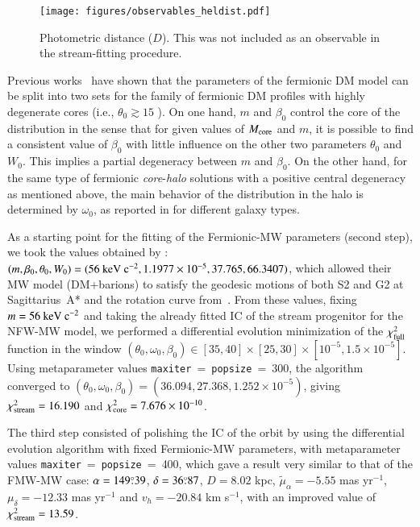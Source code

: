 \documentclass[referee]{aa} %
\begin{document}
\begin{figure}
   \texttt{[image: figures/observables\_heldist.pdf]}
   \caption{Photometric distance ($D$). This was not included as an observable in the stream-fitting procedure.}
   \label{fig:obs_radial}
\end{figure}
Previous works~\citep{arguelles_novel_2018,2019PDU....24..278A,2023ApJ...945....1K} have shown that the parameters of the fermionic DM model can be split into two sets for the family of fermionic DM profiles with highly degenerate cores (i.e., $\theta_0 \gtrsim 15$ \citealp{2019PDU....24..278A}). On one hand, $m$ and $\beta_0$ control the core of the distribution in the sense that for given values of $M_{\rm{core}}$ and $m$, it is possible to find a consistent value of $\beta_0$ with little influence on the other two parameters $\theta_0$ and $W_0$. This implies a partial degeneracy between $m$ and $\beta_0$.
On the other hand, for the same type of fermionic \textit{core}-\textit{halo} solutions with a positive central degeneracy as mentioned above, the main behavior of the distribution in the halo is determined by $\omega_0$, as reported in \cite{2019PDU....24..278A} for different galaxy types.

As a starting point for the fitting of the Fermionic-MW parameters (second step), we took the values obtained by \citet{2020A&A...641A..34B}: $(m, \beta_0, \theta_0, W_0)=(56~\rm{keV}~c^{-2}, 1.1977\times10^{-5}, 37.765, 66.3407)$, which allowed their MW model (DM+barions) to satisfy the geodesic motions of both S2 and G2 at Sagittarius~A* and the rotation curve from~\citet{sofue_rotation_2013}.
From these values, fixing $m=56~\rm{keV}~c^{-2}$ and taking the already fitted IC of the stream progenitor for the NFW-MW model, we performed a differential evolution minimization of the
$\chi^2_{\rm{full}}$ function in the window
$(\theta_0,\omega_0, \beta_0)\in [35, 40]\times[25, 30]\times[10^{-5}, 1.5\times10^{-5}]$. Using metaparameter values \texttt{maxiter}$~=~$\texttt{popsize}$~=~$300, the algorithm converged to
$(\theta_0, \omega_0, \beta_0)= (36.094, 27.368 , 1.252\times10^{-5})$, giving
$\chi^2_{\rm{stream}}= 16.190$ and  $\chi^2_{\rm{core}}= 7.676\times10^{-10}$.

The third step consisted of polishing the IC of the orbit by using the differential evolution algorithm with fixed Fermionic-MW parameters, with metaparameter values \texttt{maxiter}$~=~$\texttt{popsize}$~=~$400, which gave a result very similar to that of the FMW-MW case:
$\alpha=149\overset{\circ}{.} 39$, $\delta=36\overset{\circ}{.} 87$, $D=8.02$ kpc,
$\tilde{\mu}_\alpha=-5.55$ mas yr$^{-1}$, $\mu_\delta=-12.33$ mas yr$^{-1}$ and $v_h=-20.84$ km s$^{-1}$, with an improved value of $\chi^2_{\rm{stream}}= 13.59$.
\end{document}

